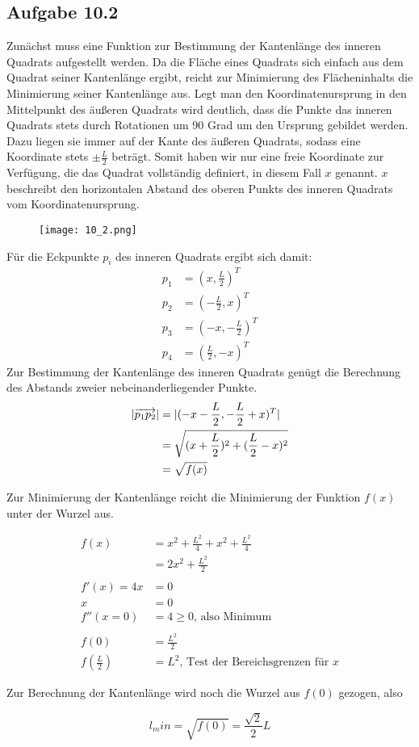 \documentclass{standalone}
\begin{document}
\subsection{Aufgabe 10.2}
Zunächst muss eine Funktion zur Bestimmung der Kantenlänge des inneren Quadrats aufgestellt werden. Da die Fläche eines Quadrats sich einfach aus dem Quadrat seiner Kantenlänge ergibt, reicht zur Minimierung des Flächeninhalts die Minimierung seiner Kantenlänge aus.
Legt man den Koordinatenursprung in den Mittelpunkt des äußeren Quadrats wird deutlich, dass die Punkte das inneren Quadrats stets durch Rotationen um 90 Grad um den Ursprung gebildet werden. Dazu liegen sie immer auf der Kante des äußeren Quadrats, sodass eine Koordinate stets $\pm \frac{L}{2}$ beträgt.
Somit haben wir nur eine freie Koordinate zur Verfügung, die das Quadrat vollständig definiert, in diesem Fall $x$ genannt.
$x$ beschreibt den horizontalen Abstand des oberen Punkts des inneren Quadrats vom Koordinatenursprung.

\begin{figure}[htbp]
    \centering
    \texttt{[image: 10\_2.png]}
\end{figure}

Für die Eckpunkte $p_i$ des inneren Quadrats ergibt sich damit:
\begin{align}
    p_1 &= (x, \frac{L}{2})^T \\
    p_2 &= (-\frac{L}{2}, x)^T \\
    p_3 &= (-x, -\frac{L}{2})^T \\
    p_4 &= (\frac{L}{2}, -x)^T
\end{align}
Zur Bestimmung der Kantenlänge des inneren Quadrats genügt die Berechnung des Abstands zweier nebeinanderliegender Punkte.
\begin{align}
    \lvert\overrightarrow{p_1 p_2}\rvert &= \lvert(-x -\frac{L}{2}, -\frac{L}{2} + x)^T\rvert \\
    &= \sqrt{(x+\frac{L}{2})^2 + (\frac{L}{2} - x)^2} \\
    &= \sqrt{f(x)}
\end{align}

Zur Minimierung der Kantenlänge reicht die Minimierung der Funktion $f(x)$ unter der Wurzel aus.

\begin{align}
    f(x) &= x^2 + \frac{L^2}{4} + x^2 + \frac{L^2}{4} \\
    &= 2x^2 + \frac{L^2}{2} \\
    \\
    f'(x) = 4x &= 0 \\
    x &= 0\\
    f''(x=0) &= 4 \geq 0 \text{, also Minimum} \\
    \\
    f(0) &= \frac{L^2}{2} \\
    f(\frac{L}{2}) &= L^2 \text{, Test der Bereichsgrenzen für } x
\end{align}

Zur Berechnung der Kantenlänge wird noch die Wurzel aus $f(0)$ gezogen, also

$$l_min = \sqrt{f(0)} = \frac{\sqrt{2}}{2} L$$
\end{document}
